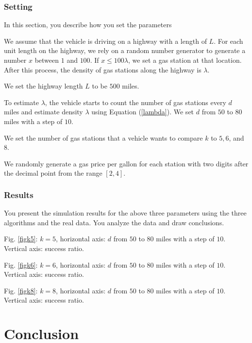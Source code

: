 \documentclass[conference]{IEEEtran}
\theoremstyle{definition}
\begin{document}
\subsubsection{Setting}
{\color{red} In this section, you describe how you set the parameters}

We assume that the vehicle is driving on a highway with a length of $L$. For each unit length on the highway,  we rely on a random number generator to generate a number $x$ between $1$ and $100$. If $x \leq 100\lambda$, we set a gas station at that location. After this process, the density of gas stations along the highway is $\lambda$.

We set the highway length $L$ to be $500$ miles.

To estimate $\lambda$, the vehicle starts to count the number of gas stations every $d$ miles and estimate  density $\lambda$ using Equation (\ref{lambda}). We set $d$ from $50$ to $80$ miles with a step of $10$.

We set the number of gas stations that a vehicle wants to compare $k$ to $5, 6$, and $8$.

We randomly generate a gas price per gallon for each station with two digits after the decimal point from the range $[2, 4]$.

\subsubsection{Results}
{\color{red} You present the simulation results for the above three parameters using the three algorithms and the real data. You analyze the data and draw conclusions.}

Fig. \ref{figk5}: $k=5$, horizontal axis: $d$ from $50$ to $80$ miles with a step of $10$. Vertical axis: success ratio.

Fig. \ref{figk6}: $k=6$, horizontal axis: $d$ from $50$ to $80$ miles with a step of $10$. Vertical axis: success ratio.

Fig. \ref{figk8}: $k=8$, horizontal axis: $d$ from $50$ to $80$ miles with a step of $10$. Vertical axis: success ratio.

\section{Conclusion} \label{conclusion}



\end{document}
